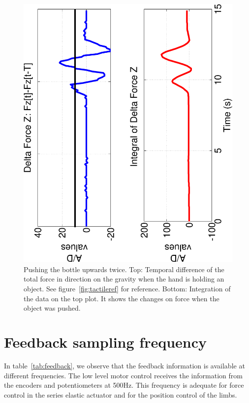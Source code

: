 \begin{figure}[tbp]
\centerline{
\includegraphics[height=\columnwidth, angle=270 ]{./figures/2TapsX.eps}
} \caption[Pushing the bottle upwards twice]{Pushing the bottle
upwards twice. Top: Temporal difference of the total force in
direction on the gravity when the hand is holding an object. See
figure~\ref{fig:tactileref} for reference. Bottom: Integration of
the data on the top plot. It shows the changes on force when the
object was pushed.} \label{fig:twotaps}
\end{figure}


\section{Feedback sampling frequency}
\label{sec:imp:timing}

In table~\ref{tab:feedback}, we observe that the feedback
information is available at different frequencies. The low level
motor control receives the information from the encoders and
potentiometers at 500Hz. This frequency is adequate for force
control in the series elastic actuator and for the position
control of the limbs.

